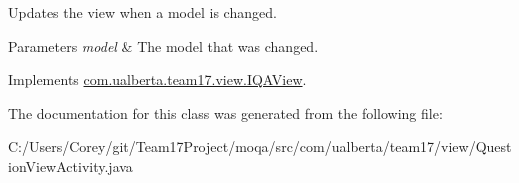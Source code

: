 Updates the view when a model is changed. 
\begin{DoxyParams}{Parameters}
{\em model} & The model that was changed. \\
\hline
\end{DoxyParams}


Implements \hyperlink{interfacecom_1_1ualberta_1_1team17_1_1view_1_1_i_q_a_view}{com.\+ualberta.\+team17.\+view.\+I\+Q\+A\+View}.



The documentation for this class was generated from the following file\+:\begin{DoxyCompactItemize}
\item 
C\+:/\+Users/\+Corey/git/\+Team17\+Project/moqa/src/com/ualberta/team17/view/Question\+View\+Activity.\+java\end{DoxyCompactItemize}
